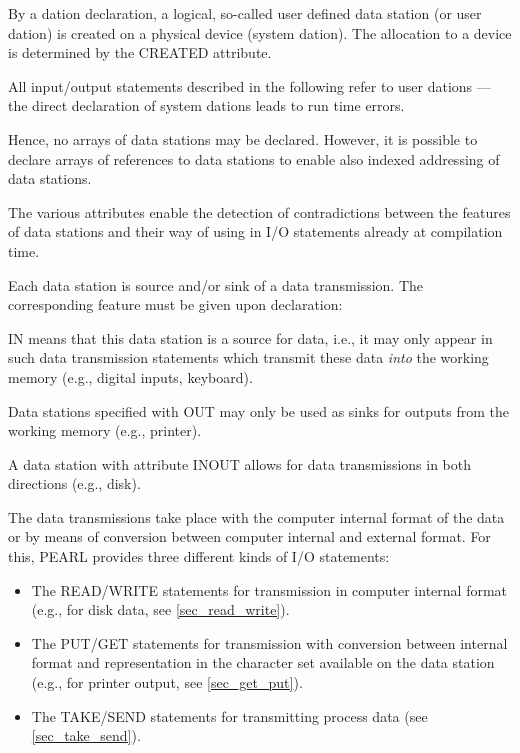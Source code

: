 By a dation declaration, a logical, so-called user defined data station
(or user dation) is created on a physical device (system dation). The
allocation to a device is determined by the 
CREATED  attribute.

All input/output statements described in the following refer to user
dations --- the direct declaration of system dations leads to run time
errors.



Hence, no arrays of data stations may be declared. However, it is
possible to declare arrays of references to data stations to enable also
indexed addressing of data stations.

The various attributes enable the detection of contradictions between
the features of data stations and their way of using in I/O statements
already at compilation time.



Each data station is source and/or sink of a data transmission. The
corresponding feature must be given upon declaration:



IN 
 means that this data station is a source for data, i.e., it may only
appear in such data transmission statements which transmit these data
{\em into} the working memory (e.g., digital inputs, keyboard).

Data stations specified with OUT  
may only be used as sinks for outputs
from the working memory (e.g., printer).

A data station with attribute INOUT 
 allows for data transmissions in
both directions (e.g., disk).

The data transmissions take place with the computer internal format of
the data or by means of conversion between computer internal and
external format. For this, PEARL provides three different kinds of I/O
statements:
\begin{itemize}
\item The READ/WRITE statements for transmission in computer internal
format (e.g., for disk data, see \ref{sec_read_write}).
\item The PUT/GET statements for transmission with conversion between
internal format and representation in the character set available on the
data station (e.g., for printer output, see \ref{sec_get_put}).
\item The TAKE/SEND statements for transmitting process data (see
\ref{sec_take_send}).
\end{itemize}

